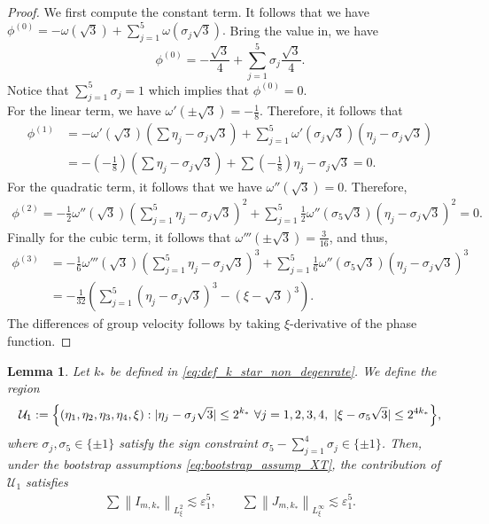 \documentclass[reqno,english,11pt]{amsart}
\newcommand{\eps}{\varepsilon}
\newcommand{\snorm}[1]{\left\|#1\right\|}
\newtheorem{lemma}[theorem]{Lemma}
\theoremstyle{definition}
\numberwithin{equation}{section}
\begin{document}
\begin{proof}
We first compute the constant term. It follows that we have 
$ \phi^{(0)}= -\omega(\sqrt{3})+\sum_{j=1}^5 \omega(\sigma_j\sqrt{3}).$
Bring the value in, we have $$\phi^{(0)} = -\frac{\sqrt{3}}{4}+\sum_{j=1}^5 \sigma_j \frac{\sqrt{3}}{4}.$$ Notice that $\sum^5_{j=1}\sigma_j=1$ which implies that $\phi^{(0)}=0.$\\
For the linear term,  we have $\omega'(\pm\sqrt{3})=-\frac{1}{8}.$ Therefore, it follows that \begin{align*}
    \phi^{(1)}&=-\omega'(\sqrt{3}) \left(\sum \eta_j - \sigma_j \sqrt{3}\right) + \sum_{j=1}^5 \omega'(\sigma_j \sqrt{3}) (\eta_j- \sigma_j \sqrt{3})\\
    &=-(-\frac{1}{8})(\sum \eta_{j}-\sigma_j\sqrt{3})+\sum (-\frac{1}{8})\eta_{j}-\sigma_j\sqrt{3}=0.
\end{align*}
For the quadratic term, it follows that we have $\omega''(\sqrt{3})=0$. Therefore,
\begin{align}
    \phi^{(2)}=-\frac{1}{2}\omega''(\sqrt{3})\left(\sum^5_{j=1} \eta_j - \sigma_j \sqrt{3}\right)^2+\sum^5_{j=1}\frac{1}{2}\omega''(\sigma_5\sqrt{3})(\eta_j-\sigma_j\sqrt{3})^2=0.
\end{align}
Finally for the cubic term, it follows that $\omega'''(\pm \sqrt{3})=\frac{3}{16}$, and thus,
\begin{align*}
\phi^{(3)}&=-\frac{1}{6}\omega'''(\sqrt{3})\left(\sum^5_{j=1} \eta_j - \sigma_j \sqrt{3}\right)^3+\sum^5_{j=1}\frac{1}{6}\omega''(\sigma_5\sqrt{3})(\eta_j-\sigma_j\sqrt{3})^3\\
&= -\frac{1}{32} \left( \sum_{j=1}^5 (\eta_j - \sigma_j\sqrt{3})^3 - (\xi - \sqrt{3})^3 \right).   
\end{align*}
The differences of group velocity follows by taking $\xi$-derivative of the phase function.
\end{proof}
\begin{lemma}\label{prop:nondeg_case_1}
Let $k_*$ be defined in \eqref{eq:def_k_star_non_degenrate}.
We define the region
$$\mathcal{U}_{1}:= \Bigl\{(\eta_1,\eta_2,\eta_3,\eta_4,\xi):|\eta_j-\sigma_j\sqrt{3}|\le 2^{k_*} \ \forall j=1,2,3,4,\ |\xi-\sigma_5\sqrt{3}|\le 2^{4k_*}\Bigr\},$$
where $\sigma_j,\sigma_5\in\{\pm1\}$ satisfy the sign constraint
$\sigma_5-\sum_{j=1}^4\sigma_j\in\{\pm1\}$. Then, under the bootstrap assumptions \eqref{eq:bootstrap_assump_XT}, the contribution of $\mathcal{U}_1$ satisfies
    \begin{align*}
        \sum\snorm{I_{m,k_*}}_{L^2_\xi}\lesssim \eps_1^5,\qquad \sum\snorm{J_{m,k_*}}_{L^\infty_\xi}\lesssim \eps_1^5.
    \end{align*}  
\end{lemma}
\end{document}
